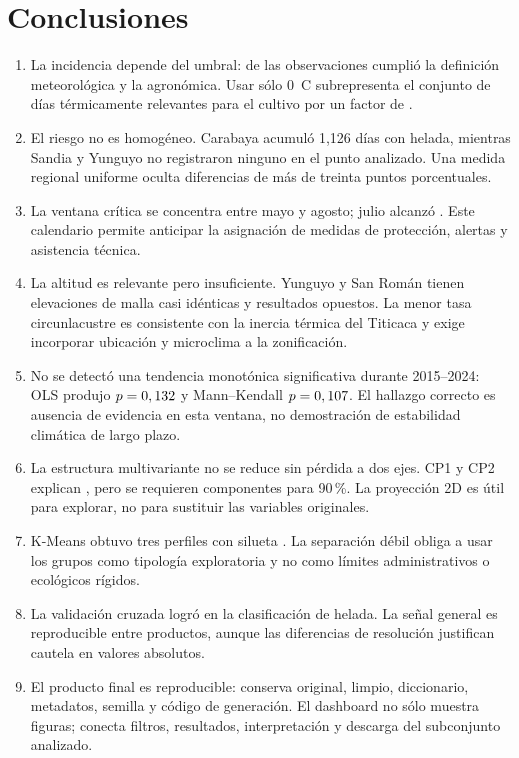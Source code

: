 \documentclass[11pt,a4paper]{article}
\begin{document}
\section{Conclusiones}

\begin{enumerate}
  \item La incidencia depende del umbral: \TasaHelada{} de las observaciones cumplió la
        definición meteorológica y \TasaHeladaAgronomica{} la agronómica. Usar sólo
        0~\textdegree C subrepresenta el conjunto de días térmicamente relevantes para el
        cultivo por un factor de \FactorAgronomico{}.
  \item El riesgo no es homogéneo. Carabaya acumuló 1,126 días con helada, mientras Sandia
        y Yunguyo no registraron ninguno en el punto analizado. Una medida regional uniforme
        oculta diferencias de más de treinta puntos porcentuales.
  \item La ventana crítica se concentra entre mayo y agosto; julio alcanzó
        \TasaJulio{}. Este calendario permite anticipar la asignación de medidas de
        protección, alertas y asistencia técnica.
  \item La altitud es relevante pero insuficiente. Yunguyo y San Román tienen elevaciones
        de malla casi idénticas y resultados opuestos. La menor tasa circunlacustre es
        consistente con la inercia térmica del Titicaca y exige incorporar ubicación y
        microclima a la zonificación.
  \item No se detectó una tendencia monotónica significativa durante 2015--2024: OLS produjo
        $p=0,132{}$ y Mann--Kendall $p=0,107{}$. El hallazgo correcto es ausencia de evidencia
        en esta ventana, no demostración de estabilidad climática de largo plazo.
  \item La estructura multivariante no se reduce sin pérdida a dos ejes. CP1 y CP2 explican
        \PCADosAcum{}, pero se requieren \PCANoventa{} componentes para 90\,\%. La
        proyección 2D es útil para explorar, no para sustituir las variables originales.
  \item K-Means obtuvo tres perfiles con silueta \Silueta{}. La separación débil obliga a
        usar los grupos como tipología exploratoria y no como límites administrativos o
        ecológicos rígidos.
  \item La validación cruzada logró \FuenteConcordancia{} en la clasificación de helada. La
        señal general es reproducible entre productos, aunque las diferencias de resolución
        justifican cautela en valores absolutos.
  \item El producto final es reproducible: conserva original, limpio, diccionario,
        metadatos, semilla y código de generación. El dashboard no sólo muestra figuras;
        conecta filtros, resultados, interpretación y descarga del subconjunto analizado.
\end{enumerate}
\end{document}

